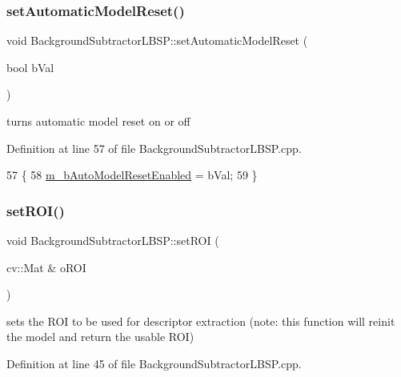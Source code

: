 \subsubsection{\texorpdfstring{set\+Automatic\+Model\+Reset()}{setAutomaticModelReset()}}
{\footnotesize\ttfamily void Background\+Subtractor\+L\+B\+S\+P\+::set\+Automatic\+Model\+Reset (\begin{DoxyParamCaption}\item[{bool}]{b\+Val }\end{DoxyParamCaption})}



turns automatic model reset on or off 



Definition at line 57 of file Background\+Subtractor\+L\+B\+S\+P.\+cpp.


\begin{DoxyCode}
57                                                                \{
58     \mbox{\hyperlink{class_background_subtractor_l_b_s_p_a9d260f4e42e3fc79fb21af950ca9087a}{m\_bAutoModelResetEnabled}} = bVal;
59 \}
\end{DoxyCode}
\mbox{\label{class_background_subtractor_l_b_s_p_a34dc38d3d925d46d289c750786f232dc}} 
\subsubsection{\texorpdfstring{set\+R\+O\+I()}{setROI()}}
{\footnotesize\ttfamily void Background\+Subtractor\+L\+B\+S\+P\+::set\+R\+OI (\begin{DoxyParamCaption}\item[{cv\+::\+Mat \&}]{o\+R\+OI }\end{DoxyParamCaption})\hspace{0.3cm}{\ttfamily [virtual]}}



sets the R\+OI to be used for descriptor extraction (note\+: this function will reinit the model and return the usable R\+OI) 



Definition at line 45 of file Background\+Subtractor\+L\+B\+S\+P.\+cpp.



